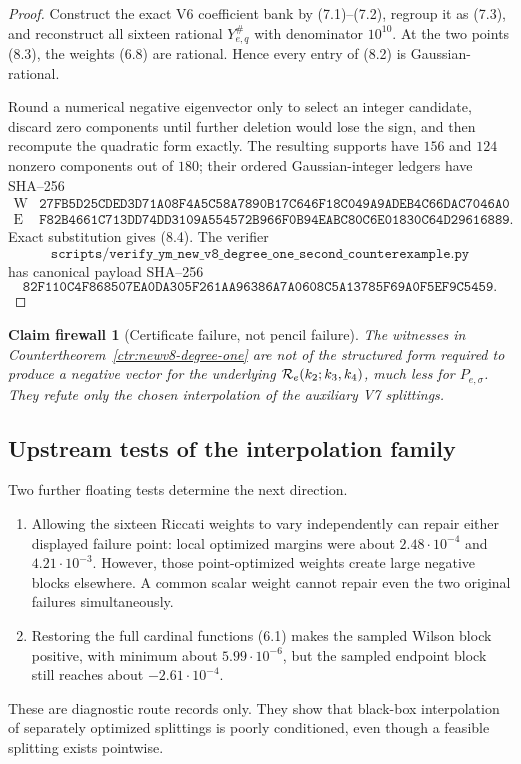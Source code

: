 \documentclass[11pt,oneside]{article}
\newtheorem{firewall}[theorem]{Claim firewall}
\theoremstyle{definition}
\theoremstyle{remark}
\begin{document}
\begin{proof}
Construct the exact V6 coefficient bank by (7.1)--(7.2), regroup it
as (7.3), and reconstruct all sixteen rational
\(Y_{e,q}^\#\) with denominator \(10^{10}\).  At the two points
(8.3), the weights (6.8) are rational.  Hence every entry of (8.2)
is Gaussian-rational.

Round a numerical negative eigenvector only to select an integer
candidate, discard zero components until further deletion would lose
the sign, and then recompute the quadratic form exactly.  The
resulting supports have \(156\) and \(124\) nonzero components out
of \(180\); their ordered Gaussian-integer ledgers have SHA--256
\[
\begin{array}{c|c}
\mathrm W&
\texttt{27FB5D25CDED3D71A08F4A5C58A7890B17C646F18C049A9ADEB4C66DAC7046A0}\\
\mathrm E&
\texttt{F82B4661C713DD74DD3109A554572B966F0B94EABC80C6E01830C64D29616889}.
\end{array}                                               \tag{8.5}
\]
Exact substitution gives (8.4).  The verifier
\[
\texttt{scripts/verify\_ym\_new\_v8\_degree\_one\_second\_counterexample.py}
\]
has canonical payload SHA--256
\[
\texttt{82F110C4F868507EA0DA305F261AA96386A7A0608C5A13785F69A0F5EF9C5459}.
                                                               \tag{8.6}
\]
\end{proof}

\begin{firewall}[Certificate failure, not pencil failure]
\label{fire:newv8-no-go}
The witnesses in Countertheorem~\ref{ctr:newv8-degree-one} are not
of the structured form required to produce a negative vector for
the underlying \({\cal R}_e(k_2;k_3,k_4)\), much less for
\(P_{e,\sigma}\).  They refute only the chosen interpolation of the
auxiliary V7 splittings.
\end{firewall}

\subsection{Upstream tests of the interpolation family}

Two further floating tests determine the next direction.
\begin{enumerate}[label=\textup{(\roman*)},leftmargin=3.3em]
\item Allowing the sixteen Riccati weights to vary independently can
repair either displayed failure point: local optimized margins were
about \(2.48\cdot10^{-4}\) and \(4.21\cdot10^{-3}\).
However, those point-optimized weights create large negative blocks
elsewhere.  A common scalar weight cannot repair even the two
original failures simultaneously.
\item Restoring the full cardinal functions (6.1) makes the sampled
Wilson block positive, with minimum about \(5.99\cdot10^{-6}\), but
the sampled endpoint block still reaches about
\(-2.61\cdot10^{-4}\).
\end{enumerate}
These are diagnostic route records only.  They show that black-box
interpolation of separately optimized splittings is poorly
conditioned, even though a feasible splitting exists pointwise.
\end{document}
